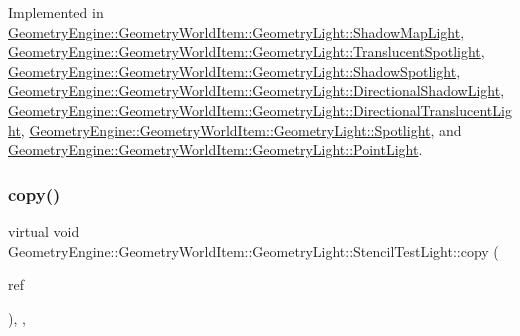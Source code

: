 Implemented in \mbox{\hyperlink{class_geometry_engine_1_1_geometry_world_item_1_1_geometry_light_1_1_shadow_map_light_a48eb6af2e6bb8487568ee4265fbc49ee}{Geometry\+Engine\+::\+Geometry\+World\+Item\+::\+Geometry\+Light\+::\+Shadow\+Map\+Light}}, \mbox{\hyperlink{class_geometry_engine_1_1_geometry_world_item_1_1_geometry_light_1_1_translucent_spotlight_a1d51bd602a6d25ba9189b2bb741bf4ef}{Geometry\+Engine\+::\+Geometry\+World\+Item\+::\+Geometry\+Light\+::\+Translucent\+Spotlight}}, \mbox{\hyperlink{class_geometry_engine_1_1_geometry_world_item_1_1_geometry_light_1_1_shadow_spotlight_a0ea8fd05d26f6e780d352168c28f940d}{Geometry\+Engine\+::\+Geometry\+World\+Item\+::\+Geometry\+Light\+::\+Shadow\+Spotlight}}, \mbox{\hyperlink{class_geometry_engine_1_1_geometry_world_item_1_1_geometry_light_1_1_directional_shadow_light_ae5016cad41a62c4c870a942acc3f9afe}{Geometry\+Engine\+::\+Geometry\+World\+Item\+::\+Geometry\+Light\+::\+Directional\+Shadow\+Light}}, \mbox{\hyperlink{class_geometry_engine_1_1_geometry_world_item_1_1_geometry_light_1_1_directional_translucent_light_aca2d4b89caa4a3059922f49ecf81c8d5}{Geometry\+Engine\+::\+Geometry\+World\+Item\+::\+Geometry\+Light\+::\+Directional\+Translucent\+Light}}, \mbox{\hyperlink{class_geometry_engine_1_1_geometry_world_item_1_1_geometry_light_1_1_spotlight_a7feb062f72b8110cf7d8d614d2daad92}{Geometry\+Engine\+::\+Geometry\+World\+Item\+::\+Geometry\+Light\+::\+Spotlight}}, and \mbox{\hyperlink{class_geometry_engine_1_1_geometry_world_item_1_1_geometry_light_1_1_point_light_a68321b758cff76fa55f3cd5ef2824035}{Geometry\+Engine\+::\+Geometry\+World\+Item\+::\+Geometry\+Light\+::\+Point\+Light}}.

\mbox{\label{class_geometry_engine_1_1_geometry_world_item_1_1_geometry_light_1_1_stencil_test_light_aa17706b35df8267c7421725548c7f399}} 
\subsubsection{\texorpdfstring{copy()}{copy()}}
{\footnotesize\ttfamily virtual void Geometry\+Engine\+::\+Geometry\+World\+Item\+::\+Geometry\+Light\+::\+Stencil\+Test\+Light\+::copy (\begin{DoxyParamCaption}\item[{const \mbox{\hyperlink{class_geometry_engine_1_1_geometry_world_item_1_1_geometry_light_1_1_stencil_test_light}{Stencil\+Test\+Light}} \&}]{ref }\end{DoxyParamCaption})\hspace{0.3cm}{\ttfamily [inline]}, {\ttfamily [protected]}, {\ttfamily [virtual]}}

